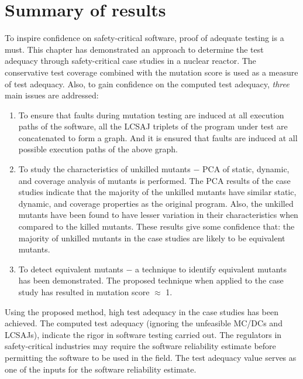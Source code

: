 \section{Summary of results}

To inspire confidence on safety-critical software, proof of adequate
testing is a must. This chapter has demonstrated an approach to determine
the test adequacy through safety-critical case studies in a nuclear
reactor. The conservative test coverage combined with the mutation score
is used as a measure of test adequacy. Also, to gain confidence on the computed
test adequacy, \emph{three} main issues are addressed:
\begin{enumerate}
\item To ensure that faults during mutation testing are induced at all execution paths of the software, all the \ac{LCSAJ} triplets of the program under test are concatenated to form a graph. And it is ensured that faults are induced at all possible execution paths of the above graph.
\item To study the characteristics of unkilled mutants $-$ \ac{PCA} of static, dynamic, and coverage analysis of mutants is performed.
The \ac{PCA} results of the case studies indicate that the majority of the unkilled
mutants have similar static, dynamic, and coverage properties as the
original program. Also, the unkilled mutants have been found to have
lesser variation in their characteristics when compared to the killed
mutants. These results give some confidence that: the majority of unkilled
mutants in the case studies are likely to be equivalent mutants. 
\item To detect equivalent mutants $-$ a technique to identify equivalent
mutants has been demonstrated. The proposed technique when applied
to the case study has resulted in mutation score $\approx$ 1.
\end{enumerate}

Using the proposed method, high test adequacy in the case studies has been achieved. The computed test adequacy (ignoring the unfeasible \ac{MC/DC}s and \ac{LCSAJ}s), indicate the rigor in software testing carried out. The regulators in safety-critical industries may require the software reliability estimate before permitting the software to be used in the field. The test adequacy value serves as one of the inputs for the software reliability estimate. 


